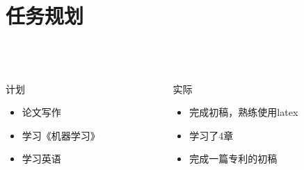 \usetikzlibrary{arrows,shapes,chains}
\section{任务规划}
\frame
{
  \frametitle{\secname~ }
  \begin{columns}[onlytextwidth]
  \begin{column}{0.35\textwidth}
  \begin{block}{计划}
  \begin{itemize}
    \item 论文写作
    \item 学习《机器学习》
    \item 学习英语
  \end{itemize}
  \end{block}
  \end{column}
  \hspace{0.5em}
  \begin{column}{0.65\textwidth}
    \begin{block}{实际}
      \begin{itemize}
        \item 完成初稿，熟练使用latex
        \item 学习了4章
        \item 完成一篇专利的初稿
      \end{itemize}
    \end{block}
  \end{column}
  \end{columns}
}

